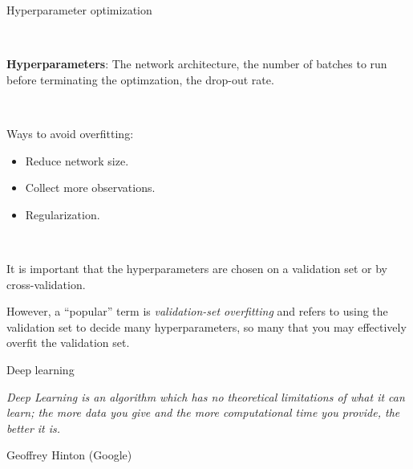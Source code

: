 \documentclass[10pt,ignorenonframetext,]{beamer}
\begin{document}
\begin{frame}

\begin{block}{Hyperparameter optimization}

\(~\)

\textbf{Hyperparameters}: The network architecture, the number of
batches to run before terminating the optimzation, the drop-out rate.

\(~\)

Ways to avoid overfitting:

\vspace{2mm}

\begin{itemize}
\item
  Reduce network size. \vspace{2mm}
\item
  Collect more observations. \vspace{2mm}
\item
  Regularization.
\end{itemize}

\(~\)

It is important that the hyperparameters are chosen on a validation set
or by cross-validation.

\vspace{2mm}

However, a ``popular'' term is \emph{validation-set overfitting} and
refers to using the validation set to decide many hyperparameters, so
many that you may effectively overfit the validation set.

\end{block}

\end{frame}

\begin{frame}{Deep learning}
\protect\hypertarget{deep-learning-1}{}

\emph{Deep Learning is an algorithm which has no theoretical limitations
of what it can learn; the more data you give and the more computational
time you provide, the better it is.}

Geoffrey Hinton (Google)

\end{frame}
\end{document}
